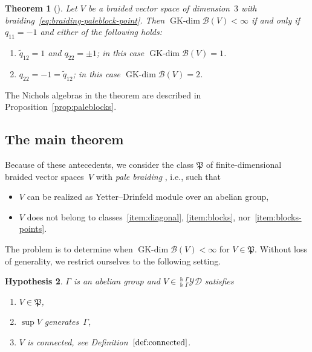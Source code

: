 \documentclass[pdftex]{sigma}
\numberwithin{equation}{section}
\newtheorem{Theorem}{Theorem}[section]
\newtheorem{hypothesis}[Theorem]{Hypothesis}
\newcommand{\GK}{\operatorname{GK-dim}}
\newcommand{\toba}{\mathscr B}
\newcommand{\pale}{\mathfrak{P}}
\newcommand{\yd}[1]{{}_{#1}^{#1}\mathcal{YD}}
\begin{document}
\begin{Theorem}[{\cite[Theorem 8.1.3]{AAH-triang}}]\label{th:paleblock-point-resumen}
Let $V$ be a braided vector space of dimension~$3$ with braiding~\eqref{eq:braiding-paleblock-point}.
Then $\GK \toba(V) < \infty$ if and only if
$q_{11} =-1$ and either of the following holds:
\begin{enumerate}[label=$(\roman*)$]\itemsep=0pt
\item%
$\widetilde{q}_{12} = 1$ and $q_{22} = \pm 1$; in this case $\GK \toba(V) = 1$.

\item%
$q_{22} = -1 = \widetilde{q}_{12}$; in this case $\GK \toba(V) = 2$.
\end{enumerate}
\end{Theorem}

The Nichols algebras in the theorem are described in Proposition~\ref{prop:paleblocks}.

\subsection{The main theorem}
Because of these antecedents, we consider the class $\pale$ of finite-dimensional braided vector spaces~$V$
with \emph{pale braiding} \cite{AAH-triang}, i.e., such that
\begin{itemize}\itemsep=0pt
\item $V$ can be realized as Yetter--Drinfeld module over an abelian group,
\item $V$ does not belong to classes~\ref{item:diagonal}, \ref{item:blocks}, nor~\ref{item:blocks-points}.
\end{itemize}

The problem is to determine when $\GK \toba(V) < \infty$ for $V \in \pale$.
Without loss of generality, we restrict ourselves to the following setting.
\begin{hypothesis}\label{hyp:pale}
$\Gamma$ is an abelian group and $V \in \yd{\Bbbk\Gamma}$ satisfies
\begin{enumerate}[label=\rm{(\Roman*)}]
\item\label{item:hyp-pale} $V \in \pale$,

\item\label{item:hyp-suppgen} $\sup V$ generates~$\Gamma$,

\item\label{item:hyp-connected} $V$ is connected, see Definition~$\ref{def:connected}$.
\end{enumerate}
\end{hypothesis}
\end{document}
